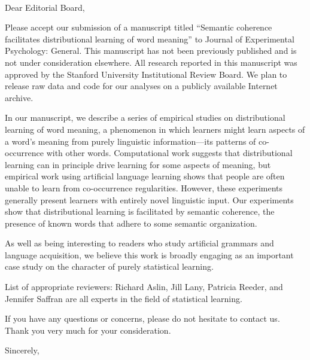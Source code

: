 \documentclass{letter}
\begin{document}
\address{450 Serra Mall \\ Building 420 (Jordan Hall) \\ Stanford, CA~~94305}
\signature{Long Ouyang, Lera Boroditsky,\\and Michael C. Frank}

\pagestyle{empty}
\begin{letter}{~~~}
\opening{Dear Editorial Board,}

Please accept our submission of a manuscript titled ``Semantic coherence facilitates distributional learning of word meaning'' to Journal of Experimental Psychology: General. This manuscript has not been previously published and is not under consideration elsewhere. All research reported in this manuscript was approved by the Stanford University Institutional Review Board. We plan to release raw data and code for our analyses on a publicly available Internet archive.

In our manuscript, we describe a series of empirical studies on distributional learning of word meaning, a phenomenon in which learners might learn aspects of a word's meaning from purely linguistic information---its patterns of co-occurrence with other words. Computational work suggests that distributional learning can in principle drive learning for some aspects of meaning, but empirical work using artificial language learning shows that people are often unable to learn from co-occurrence regularities. However, these experiments generally present learners with entirely novel linguistic input. Our experiments show that distributional learning is facilitated by semantic coherence, the presence of known words that adhere to some semantic organization.

As well as being interesting to readers who study artificial grammars and language acquisition, we believe this work is broadly engaging as an important case study on the character of purely statistical learning.

List of appropriate reviewers: Richard Aslin, Jill Lany, Patricia Reeder, and Jennifer Saffran are all experts in the field of statistical learning.

If you have any questions or concerns, please do not hesitate to contact us. Thank you very much for your consideration.



\vspace{3\parskip}
\closing{Sincerely,}

\end{letter}
\end{document}
